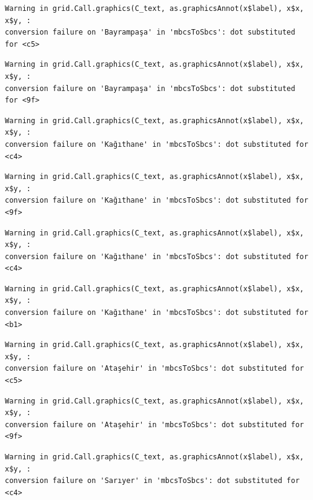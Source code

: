 \documentclass[
  11pt,
  a4paper,
  DIV=11,
  numbers=noendperiod]{scrartcl}
\begin{document}
\begin{verbatim}
Warning in grid.Call.graphics(C_text, as.graphicsAnnot(x$label), x$x, x$y, :
conversion failure on 'Bayrampaşa' in 'mbcsToSbcs': dot substituted for <c5>
\end{verbatim}

\begin{verbatim}
Warning in grid.Call.graphics(C_text, as.graphicsAnnot(x$label), x$x, x$y, :
conversion failure on 'Bayrampaşa' in 'mbcsToSbcs': dot substituted for <9f>
\end{verbatim}

\begin{verbatim}
Warning in grid.Call.graphics(C_text, as.graphicsAnnot(x$label), x$x, x$y, :
conversion failure on 'Kağıthane' in 'mbcsToSbcs': dot substituted for <c4>
\end{verbatim}

\begin{verbatim}
Warning in grid.Call.graphics(C_text, as.graphicsAnnot(x$label), x$x, x$y, :
conversion failure on 'Kağıthane' in 'mbcsToSbcs': dot substituted for <9f>
\end{verbatim}

\begin{verbatim}
Warning in grid.Call.graphics(C_text, as.graphicsAnnot(x$label), x$x, x$y, :
conversion failure on 'Kağıthane' in 'mbcsToSbcs': dot substituted for <c4>
\end{verbatim}

\begin{verbatim}
Warning in grid.Call.graphics(C_text, as.graphicsAnnot(x$label), x$x, x$y, :
conversion failure on 'Kağıthane' in 'mbcsToSbcs': dot substituted for <b1>
\end{verbatim}

\begin{verbatim}
Warning in grid.Call.graphics(C_text, as.graphicsAnnot(x$label), x$x, x$y, :
conversion failure on 'Ataşehir' in 'mbcsToSbcs': dot substituted for <c5>
\end{verbatim}

\begin{verbatim}
Warning in grid.Call.graphics(C_text, as.graphicsAnnot(x$label), x$x, x$y, :
conversion failure on 'Ataşehir' in 'mbcsToSbcs': dot substituted for <9f>
\end{verbatim}

\begin{verbatim}
Warning in grid.Call.graphics(C_text, as.graphicsAnnot(x$label), x$x, x$y, :
conversion failure on 'Sarıyer' in 'mbcsToSbcs': dot substituted for <c4>
\end{verbatim}
\end{document}

